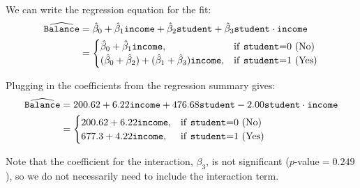 \documentclass[10pt]{beamer}\usepackage[]{graphicx}\usepackage[]{color}
\begin{document}
\begin{frame}[fragile]
We can write the regression equation for the fit:
\begin{align*}
\widehat{\texttt{Balance}} &= \hat{\beta}_0 + \hat{\beta}_1 \texttt{income} + \hat{\beta}_2 \texttt{student} 
+ \hat{\beta}_3 \texttt{student} \cdot \texttt{income}\\ 
& = \begin{cases}
\hat{\beta}_0 + \hat{\beta}_1 \texttt{income}, & \text{if \texttt{student}=0 (No)}\\
(\hat{\beta}_0 + \hat{\beta}_2) + (\hat{\beta}_1 + \hat{\beta}_3) \texttt{income}, & \text{if \texttt{student}=1 (Yes)}\\
\end{cases}
\end{align*}
\vspace{5pt}

Plugging in the coefficients from the regression summary gives:
\begin{align*}
\widehat{\texttt{Balance}} &= 200.62 + 6.22 \texttt{income} + 476.68 \texttt{student} 
- 2.00 \texttt{student} \cdot \texttt{income}\\ 
& = \begin{cases}
200.62 + 6.22\texttt{income}, & \text{if \texttt{student}=0 (No)}\\
677.3 + 4.22 \texttt{income}, & \text{if \texttt{student}=1 (Yes)}\\
\end{cases}
\end{align*}
\vspace{5pt}

Note that the coefficient for the interaction, $\beta_3$, is not significant ($p$-value$ = 0.249$), so we do not necessarily need to include the interaction term.
\end{frame}
\end{document}

